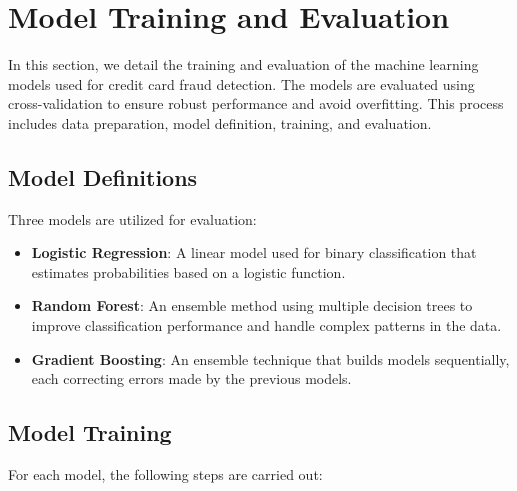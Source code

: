 \documentclass{article}
\begin{document}
\section{Model Training and Evaluation}

In this section, we detail the training and evaluation of the machine learning models used for credit card fraud detection. The models are evaluated using cross-validation to ensure robust performance and avoid overfitting. This process includes data preparation, model definition, training, and evaluation.

\subsection{Model Definitions}

Three models are utilized for evaluation:

\begin{itemize}
    \item \textbf{Logistic Regression}: A linear model used for binary classification that estimates probabilities based on a logistic function.
    \item \textbf{Random Forest}: An ensemble method using multiple decision trees to improve classification performance and handle complex patterns in the data.
    \item \textbf{Gradient Boosting}: An ensemble technique that builds models sequentially, each correcting errors made by the previous models.
\end{itemize}

\subsection{Model Training}

For each model, the following steps are carried out:
\end{document}
